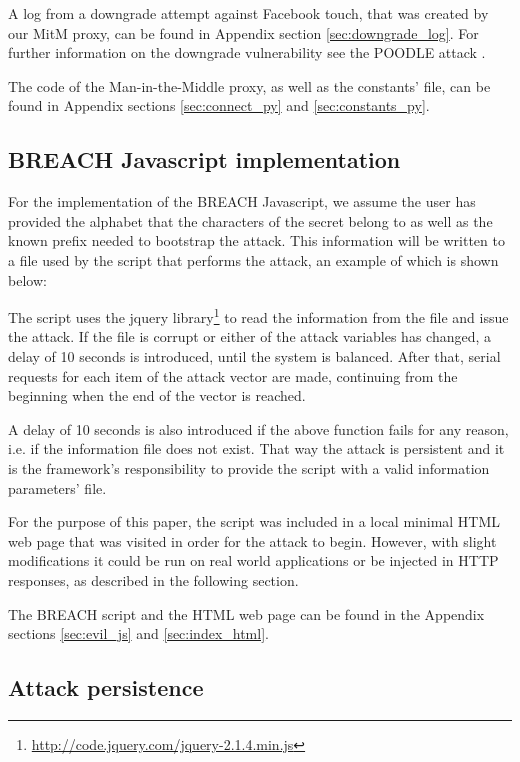 A log from a downgrade attempt against Facebook touch, that was created by our
MitM proxy, can be found in Appendix section \ref{sec:downgrade_log}. For
further information on the downgrade vulnerability see the POODLE attack
\cite{poodle}.

The code of the Man-in-the-Middle proxy, as well as the constants' file, can
be found in Appendix sections \ref{sec:connect_py} and \ref{sec:constants_py}.

\subsection{BREACH Javascript implementation}

For the implementation of the BREACH Javascript, we assume the user has provided
the alphabet that the characters of the secret belong to as well as the known
prefix needed to bootstrap the attack. This information will be written to a
file used by the script that performs the attack, an example of which is shown
below:


The script uses the jquery
library\footnote{\url{http://code.jquery.com/jquery-2.1.4.min.js}} to read the
information from the file and issue the attack. If the file is corrupt or either
of the attack variables has changed, a delay of 10 seconds is introduced, until
the system is balanced. After that, serial requests for each item of the attack
vector are made, continuing from the beginning when the end of the vector is
reached.

A delay of 10 seconds is also introduced if the above function fails for any
reason, i.e. if the information file does not exist. That way the attack is
persistent and it is the framework's responsibility to provide the script with a
valid information parameters' file.

For the purpose of this paper, the script was included in a local minimal HTML
web page that was visited in order for the attack to begin. However, with slight
modifications it could be run on real world applications or be injected in HTTP
responses, as described in the following section.

The BREACH script and the HTML web page can be found in the Appendix sections
\ref{sec:evil_js} and \ref{sec:index_html}.

\subsection{Attack persistence}\label{sec:persistence}

